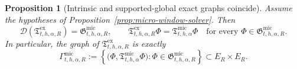 \documentclass[11pt,a4paper]{amsart}
\theoremstyle{plain}
\newtheorem{proposition}[theorem]{Proposition}
\theoremstyle{definition}
\theoremstyle{remark}
\begin{document}
\begin{proposition}[Intrinsic and supported-global exact graphs coincide]
\label{prop:micro-window-identification}
Assume the hypotheses of Proposition~\ref{prop:micro-window-solver}. Then
\begin{equation}\label{eq:micro-window-identification}
\mathcal D(\mathfrak T_{t,h,\alpha,R}^{\mathrm{ex}})
=
\mathfrak G_{t,h,\alpha,R}^{\mathrm{mic}},
\qquad
\mathfrak T_{t,h,\alpha,R}^{\mathrm{ex}}\Phi
=
\mathfrak T_{t,h,\alpha}^{\mathrm{mic}}\Phi
\quad
\text{for every }\Phi\in \mathfrak G_{t,h,\alpha,R}^{\mathrm{mic}}.
\end{equation}
In particular, the graph of \(\mathfrak T_{t,h,\alpha,R}^{\mathrm{ex}}\) is exactly
\[
\Gamma_{t,h,\alpha,R}^{\mathrm{mic}}
:=
\left\{
\bigl(
\Phi,\mathfrak T_{t,h,\alpha}^{\mathrm{mic}}\Phi
\bigr):
\Phi\in\mathfrak G_{t,h,\alpha,R}^{\mathrm{mic}}
\right\}
\subset E_R\times E_R.
\]
\end{proposition}
\end{document}

